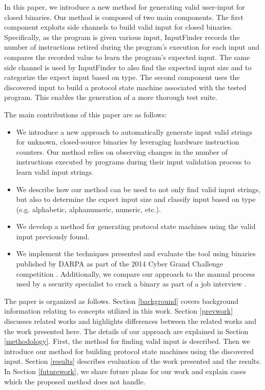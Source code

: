 \documentclass{acm_proc_article-sp}
\def \tool {InputFinder}
\begin{document}
In this paper, we introduce a new method for generating valid user-input for closed binaries. 
Our method is composed of two main components.
The first component exploits side channels to build valid input for closed binaries.
Specifically, as the program is given various input, \tool{} records the number of instructions retired during the program's execution for each input and compares the recorded value to learn the program's expected input.
The same side channel is used by \tool{} to also find the expected input size and to categorize the expect input based on type.
The second component uses the discovered input to build a protocol state machine associated with the tested program.
This enables the generation of a more thorough test suite.

The main contributions of this paper are as follows:
\begin{itemize}
	\item We introduce a new approach to automatically generate input valid strings for unknown, closed-source binaries by leveraging hardware instruction counters. Our method relies on observing changes in the number of instructions executed by programs during their input validation process to learn valid input strings.
	\item We describe how our method can be used to not only find valid input strings, but also to determine the expect input size and classify input based on type (e.g. alphabetic, alphanumeric, numeric, etc.).
	\item We develop a method for generating protocol state machines using the valid input previously found.
	\item We implement the techniques presented and evaluate the tool using binaries published by DARPA as part of the 2014 Cyber Grand Challenge competition \cite{darpacgc}. Additionally, we compare our approach to the manual process used by a security specialist to crack a binary as part of a job interview \cite{interviewbinary}.
\end{itemize}

The paper is organized as follows.
Section \ref{background} covers background information relating to concepts utilized in this work.
Section \ref{prevwork} discusses related works and highlights differences between the related works and the work presented here.
The details of our approach are explained in Section \ref{methodology}. First, the method for finding valid input is described. Then we introduce our method for building protocol state machines using the discovered input.
Section \ref{results} describes evaluation of the work presented and the results.
In Section \ref{futurework}, we share future plans for our work and explain cases which the proposed method does not handle.
\end{document}

